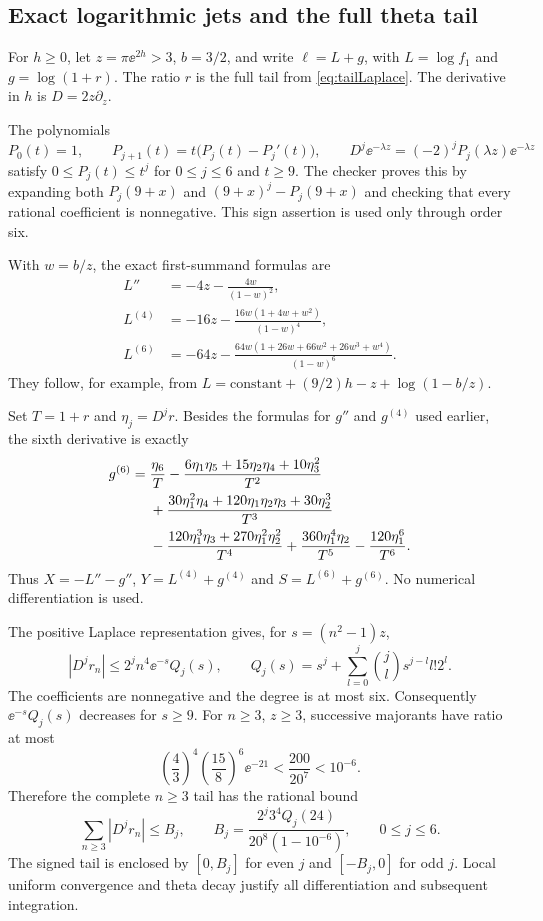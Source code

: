 \subsection{Exact logarithmic jets and the full theta tail}
For $h\ge0$, let $z=\pi\ee^{2h}>3$, $b=3/2$, and write $\ell=L+g$, with $L=\log f_1$ and $g=\log(1+r)$. The ratio $r$ is the full tail from \eqref{eq:tailLaplace}. The derivative in $h$ is $D=2z\partial_z$.

The polynomials
\begin{equation}\label{eq:Pjrecurrence}
P_0(t)=1,\qquad P_{j+1}(t)=t\bigl(P_j(t)-P_j'(t)\bigr),
\qquad D^j\ee^{-\lambda z}=(-2)^jP_j(\lambda z)\ee^{-\lambda z}
\end{equation}
satisfy $0\le P_j(t)\le t^j$ for $0\le j\le6$ and $t\ge9$. The checker proves this by expanding both $P_j(9+x)$ and $(9+x)^j-P_j(9+x)$ and checking that every rational coefficient is nonnegative. This sign assertion is used only through order six.

With $w=b/z$, the exact first-summand formulas are
\begin{align}
L''&=-4z-\frac{4w}{(1-w)^2},\\
L^{(4)}&=-16z-\frac{16w(1+4w+w^2)}{(1-w)^4},\\
L^{(6)}&=-64z-\frac{64w(1+26w+66w^2+26w^3+w^4)}{(1-w)^6}.
\end{align}
They follow, for example, from $L=\text{constant}+(9/2)h-z+\log(1-b/z)$.

Set $T=1+r$ and $\eta_j=D^jr$. Besides the formulas for $g''$ and $g^{(4)}$ used earlier, the sixth derivative is exactly
\begin{align}\label{eq:g6}
g^{(6)}={}&\frac{\eta_6}{T}
-\frac{6\eta_1\eta_5+15\eta_2\eta_4+10\eta_3^2}{T^2}\notag\\
&+\frac{30\eta_1^2\eta_4+120\eta_1\eta_2\eta_3+30\eta_2^3}{T^3}\notag\\
&-\frac{120\eta_1^3\eta_3+270\eta_1^2\eta_2^2}{T^4}
+\frac{360\eta_1^4\eta_2}{T^5}-\frac{120\eta_1^6}{T^6}.
\end{align}
Thus $X=-L''-g''$, $Y=L^{(4)}+g^{(4)}$ and $S=L^{(6)}+g^{(6)}$. No numerical differentiation is used.

The positive Laplace representation gives, for $s=(n^2-1)z$,
\begin{equation}\label{eq:tailQ}
|D^jr_n|\le2^jn^4\ee^{-s}Q_j(s),\qquad
Q_j(s)=s^j+\sum_{l=0}^j\binom jl s^{j-l}l!2^l.
\end{equation}
The coefficients are nonnegative and the degree is at most six. Consequently $\ee^{-s}Q_j(s)$ decreases for $s\ge9$. For $n\ge3$, $z\ge3$, successive majorants have ratio at most
\[
\left(\frac43\right)^4\left(\frac{15}{8}\right)^6\ee^{-21}
<\frac{200}{20^7}<10^{-6}.
\]
Therefore the complete $n\ge3$ tail has the rational bound
\begin{equation}\label{eq:tailBj}
\sum_{n\ge3}|D^jr_n|\le B_j,
\qquad B_j=\frac{2^j3^4Q_j(24)}{20^8(1-10^{-6})},
\qquad 0\le j\le6.
\end{equation}
The signed tail is enclosed by $[0,B_j]$ for even $j$ and $[-B_j,0]$ for odd $j$. Local uniform convergence and theta decay justify all differentiation and subsequent integration.

